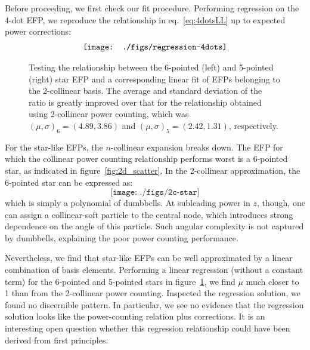 \documentclass[a4paper,11pt]{article}
\newcommand{\eq}[1]{eq.~\eqref{eq:#1}}
\newcommand{\fig}[1]{figure~\ref{fig:#1}}
\begin{document}
Before proceeding, we first check our fit procedure.
%
Performing regression on the 4-dot EFP, we reproduce the relationship in \eq{4dotsLL} up to expected power corrections:
%
\begin{align}
 \texttt{[image: ./figs/regression-4dots]}  \raisetag{2.0\baselineskip}  
\end{align}



\begin{figure}[!t]\centering
{}
  \hfill
  \caption{Testing the relationship between the 6-pointed (left) and 5-pointed (right) star EFP and a corresponding linear fit of EFPs belonging to the 2-collinear basis. The average and standard deviation of the ratio is greatly improved over that for the relationship obtained using 2-collinear power counting, which was $(\mu,\sigma)_6= (4.89, 3.86)$ and $(\mu,\sigma)_5=(2.42,1.31)$, respectively. \label{fig:starfit}}
\end{figure}


For the star-like EFPs, the $n$-collinear expansion breaks down.
%
The EFP for which the collinear power counting relationship performs worst is a 6-pointed star, as indicated in \fig{2d_scatter}.
%
In the 2-collinear approximation, the 6-pointed star can be expressed as:
%
\begin{equation}
  \texttt{[image: ./figs/2c-star]}
\end{equation}
%
which is simply a polynomial of dumbbells.
%
At subleading power in $z$, though, one can assign a collinear-soft particle to the central node, which introduces strong dependence on the angle of this particle.
%
Such angular complexity is not captured by dumbbells, explaining the poor power counting performance. 


Nevertheless, we find that star-like EFPs can be well approximated by a linear combination of basis elements.
%
Performing a linear regression (without a constant term) for the 6-pointed and 5-pointed stars in \fig{starfit}, we find $\mu$ much closer to 1 than from the 2-collinear power counting.
%
Inspected the regression solution, we found no discernible pattern.
%
In particular, we see no evidence that the regression solution looks like the power-counting relation plus corrections.
%
It is an interesting open question whether this regression relationship could have been derived from first principles. 
\end{document}
